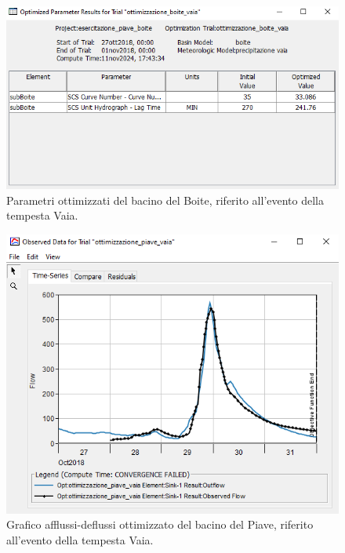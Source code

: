 \begin{figure}[H]\centering
    \includegraphics[scale=1]{immagini/par_ottimiz_boite.PNG}
    \caption{Parametri ottimizzati del bacino del Boite, riferito all'evento della tempesta Vaia.}
        \label{par_ottim_boite}    
    \end{figure}

\begin{figure}[H]\centering
    \includegraphics[scale=1]{immagini/ottim_piave.PNG}
    \caption{Grafico afflussi-deflussi ottimizzato del bacino del Piave, riferito all'evento della tempesta Vaia.}
        \label{ottim_piave}    
\end{figure}

